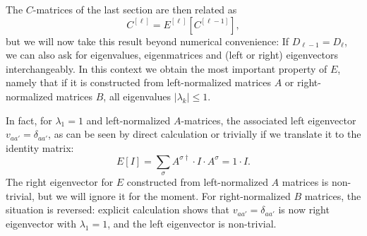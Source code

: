 \documentclass[a4paper,10pt,oneside,onecolumn,1p,times]{elsarticle}
\begin{document}
The $C$-matrices of the last section are then related as
\begin{equation}
C^{[\ell]} = E^{[\ell]} [C^{[\ell-1]}]  ,
\end{equation}
but we will now take this result beyond numerical convenience: If $D_{\ell-1}=D_\ell$, we can also ask for eigenvalues, eigenmatrices and (left or right) eigenvectors interchangeably. In this context we obtain the most important property of $E$, namely that if it is constructed from left-normalized matrices $A$ or right-normalized matrices $B$, all eigenvalues $|\lambda_k| \leq 1$. 

In fact, for $\lambda_1=1$ and left-normalized $A$-matrices, the associated left eigenvector $v_{aa'}=\delta_{aa'}$, as can be seen by direct calculation or trivially if we translate it to the identity matrix:
\begin{equation}
E[I] = \sum_\sigma A^{\sigma\dagger} \cdot I \cdot A^{\sigma} = 1 \cdot I .
\end{equation}
The right eigenvector for $E$ constructed from left-normalized $A$ matrices is non-trivial, but we will ignore it for the moment. For right-normalized $B$ matrices, the situation is reversed: explicit calculation shows that $v_{aa'}=\delta_{aa'}$ is now right eigenvector with $\lambda_1=1$, and the left eigenvector is non-trivial. 
\end{document}
